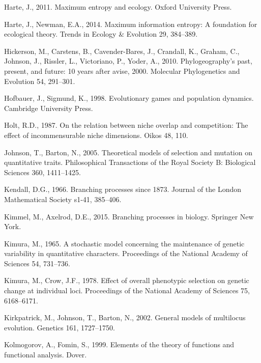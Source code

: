 \documentclass[]{elsarticle} %
\begin{document}
\leavevmode\hypertarget{ref-Harte2011}{}%
Harte, J., 2011. Maximum entropy and ecology. Oxford University Press.

\leavevmode\hypertarget{ref-Harte2014}{}%
Harte, J., Newman, E.A., 2014. Maximum information entropy: A foundation
for ecological theory. Trends in Ecology \& Evolution 29, 384--389.

\leavevmode\hypertarget{ref-Hickerson2010}{}%
Hickerson, M., Carstens, B., Cavender-Bares, J., Crandall, K., Graham,
C., Johnson, J., Rissler, L., Victoriano, P., Yoder, A., 2010.
Phylogeography's past, present, and future: 10 years after avise, 2000.
Molecular Phylogenetics and Evolution 54, 291--301.

\leavevmode\hypertarget{ref-Hofbauer1998}{}%
Hofbauer, J., Sigmund, K., 1998. Evolutionary games and population
dynamics. Cambridge University Press.

\leavevmode\hypertarget{ref-Holt1987}{}%
Holt, R.D., 1987. On the relation between niche overlap and competition:
The effect of incommensurable niche dimensions. Oikos 48, 110.

\leavevmode\hypertarget{ref-Johnson2005}{}%
Johnson, T., Barton, N., 2005. Theoretical models of selection and
mutation on quantitative traits. Philosophical Transactions of the Royal
Society B: Biological Sciences 360, 1411--1425.

\leavevmode\hypertarget{ref-Kendall1966}{}%
Kendall, D.G., 1966. Branching processes since 1873. Journal of the
London Mathematical Society s1-41, 385--406.

\leavevmode\hypertarget{ref-Kimmel2015}{}%
Kimmel, M., Axelrod, D.E., 2015. Branching processes in biology.
Springer New York.

\leavevmode\hypertarget{ref-Kimura1965}{}%
Kimura, M., 1965. A stochastic model concerning the maintenance of
genetic variability in quantitative characters. Proceedings of the
National Academy of Sciences 54, 731--736.

\leavevmode\hypertarget{ref-Kimura1978}{}%
Kimura, M., Crow, J.F., 1978. Effect of overall phenotypic selection on
genetic change at individual loci. Proceedings of the National Academy
of Sciences 75, 6168--6171.

\leavevmode\hypertarget{ref-Kirkpatrick1727}{}%
Kirkpatrick, M., Johnson, T., Barton, N., 2002. General models of
multilocus evolution. Genetics 161, 1727--1750.

\leavevmode\hypertarget{ref-kolmogorov1999elements}{}%
Kolmogorov, A., Fomin, S., 1999. Elements of the theory of functions and
functional analysis. Dover.
\end{document}
